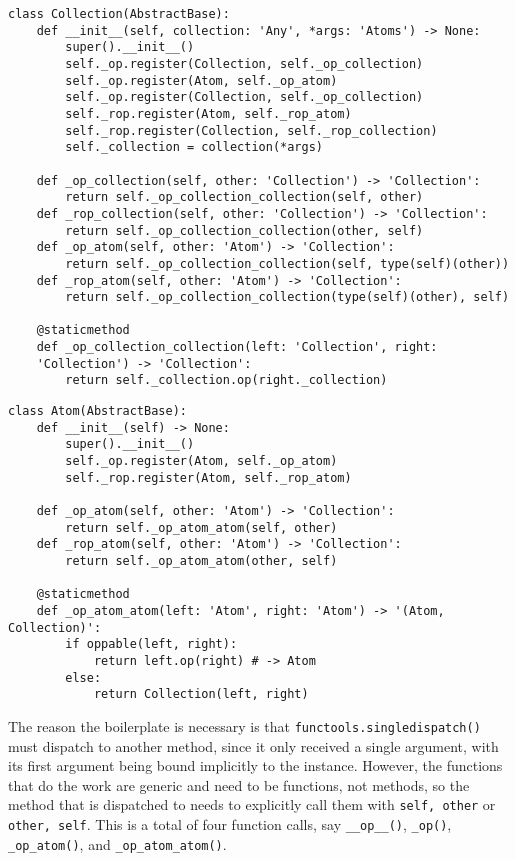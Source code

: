 \documentclass[12pt]{article}
\begin{document}
\begin{lstlisting}
class Collection(AbstractBase):
    def __init__(self, collection: 'Any', *args: 'Atoms') -> None:
        super().__init__()
        self._op.register(Collection, self._op_collection)
        self._op.register(Atom, self._op_atom)
        self._op.register(Collection, self._op_collection)
        self._rop.register(Atom, self._rop_atom)
        self._rop.register(Collection, self._rop_collection)
        self._collection = collection(*args)

    def _op_collection(self, other: 'Collection') -> 'Collection':
        return self._op_collection_collection(self, other)
    def _rop_collection(self, other: 'Collection') -> 'Collection':
        return self._op_collection_collection(other, self)
    def _op_atom(self, other: 'Atom') -> 'Collection':
        return self._op_collection_collection(self, type(self)(other))
    def _rop_atom(self, other: 'Atom') -> 'Collection':
        return self._op_collection_collection(type(self)(other), self)

    @staticmethod
    def _op_collection_collection(left: 'Collection', right:
    'Collection') -> 'Collection':
        return self._collection.op(right._collection)
\end{lstlisting}

\begin{lstlisting}
class Atom(AbstractBase):
    def __init__(self) -> None:
        super().__init__()
        self._op.register(Atom, self._op_atom)
        self._rop.register(Atom, self._rop_atom)

    def _op_atom(self, other: 'Atom') -> 'Collection':
        return self._op_atom_atom(self, other)
    def _rop_atom(self, other: 'Atom') -> 'Collection':
        return self._op_atom_atom(other, self)

    @staticmethod
    def _op_atom_atom(left: 'Atom', right: 'Atom') -> '(Atom, Collection)':
        if oppable(left, right):
            return left.op(right) # -> Atom
        else:
            return Collection(left, right)
\end{lstlisting}

The reason the boilerplate is necessary is that
\texttt{functools.singledispatch()} must dispatch to another method,
since it only received a single argument, with its first argument
being bound implicitly to the instance.  However, the functions that
do the work are generic and need to be functions, not methods, so the
method that is dispatched to needs to explicitly call them with
\texttt{self, other} or \texttt{other, self}.  This is a total of four
function calls, say \texttt{\_\_op\_\_()}, \texttt{\_op()},
\texttt{\_op\_atom()}, and \texttt{\_op\_atom\_atom()}.
\end{document}
